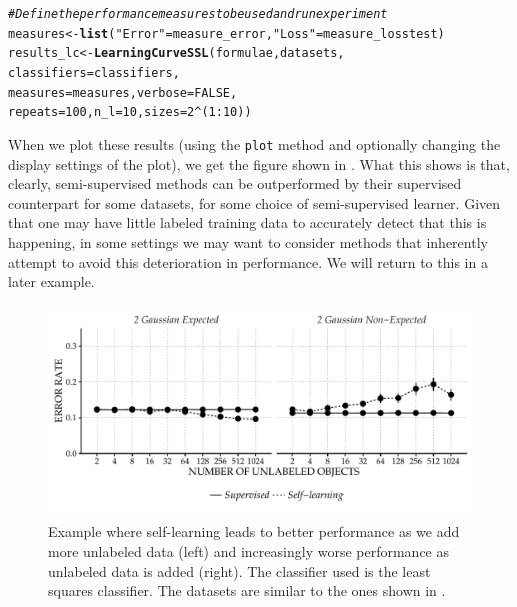 \documentclass[runningheads,a4paper]{llncs}\usepackage[]{graphicx}\usepackage[]{color}
\makeatletter
\def\maxwidth{ %
  \ifdim\Gin@nat@width>\linewidth
    \linewidth
  \else
    \Gin@nat@width
  \fi
}
\newcommand{\hlnum}[1]{\textcolor[rgb]{0.686,0.059,0.569}{#1}}%
\newcommand{\hlstr}[1]{\textcolor[rgb]{0.192,0.494,0.8}{#1}}%
\newcommand{\hlcom}[1]{\textcolor[rgb]{0.678,0.584,0.686}{\textit{#1}}}%
\newcommand{\hlopt}[1]{\textcolor[rgb]{0,0,0}{#1}}%
\newcommand{\hlstd}[1]{\textcolor[rgb]{0.345,0.345,0.345}{#1}}%
\newcommand{\hlkwb}[1]{\textcolor[rgb]{0.69,0.353,0.396}{#1}}%
\newcommand{\hlkwc}[1]{\textcolor[rgb]{0.333,0.667,0.333}{#1}}%
\newcommand{\hlkwd}[1]{\textcolor[rgb]{0.737,0.353,0.396}{\textbf{#1}}}%
\newenvironment{kframe}{%
 \def\at@end@of@kframe{}%
 \ifinner\ifhmode%
  \def\at@end@of@kframe{\end{minipage}}%
  \begin{minipage}{\columnwidth}%
 \fi\fi%
 \def\FrameCommand##1{\hskip\@totalleftmargin \hskip-\fboxsep
 \colorbox{shadecolor}{##1}\hskip-\fboxsep
     \hskip-\linewidth \hskip-\@totalleftmargin \hskip\columnwidth}%
 \MakeFramed {\advance\hsize-\width
   \@totalleftmargin\z@ \linewidth\hsize
   \@setminipage}}%
 {\par\unskip\endMakeFramed%
 \at@end@of@kframe}
\newenvironment{knitrout}{}{} %
\makeatother
\begin{document}
\begin{knitrout}
\begin{kframe}
\begin{alltt}
\hlcom{# Define the performance measures to be used and run experiment}
\hlstd{measures} \hlkwb{<-} \hlkwd{list}\hlstd{(}\hlstr{"Error"} \hlstd{=  measure_error,} \hlstr{"Loss"} \hlstd{= measure_losstest)}
\hlstd{results_lc} \hlkwb{<-} \hlkwd{LearningCurveSSL}\hlstd{(formulae,datasets,}
                           \hlkwc{classifiers}\hlstd{=classifiers,}
                           \hlkwc{measures}\hlstd{=measures,}\hlkwc{verbose}\hlstd{=}\hlnum{FALSE}\hlstd{,}
                           \hlkwc{repeats}\hlstd{=}\hlnum{100}\hlstd{,}\hlkwc{n_l}\hlstd{=}\hlnum{10}\hlstd{,}\hlkwc{sizes} \hlstd{=} \hlnum{2}\hlopt{^}\hlstd{(}\hlnum{1}\hlopt{:}\hlnum{10}\hlstd{))}
\end{alltt}
\end{kframe}
\end{knitrout}
\noindent When we plot these results (using the \texttt{plot} method and optionally changing the display settings of the plot), we get the figure shown in . What this shows is that, clearly, semi-supervised methods can be outperformed by their supervised counterpart for some datasets, for some choice of semi-supervised learner. Given that one may have little labeled training data to accurately detect that this is happening, in some settings we may want to consider methods that inherently attempt to avoid this deterioration in performance. We will return to this in a later example.

\begin{knitrout}
\color{fgcolor}\begin{figure}
\includegraphics[width=\maxwidth]{figure/plot-lc-1} \caption{Example where self-learning leads to better performance as we add more unlabeled data (left) and increasingly worse performance as unlabeled data is added (right). The classifier used is the least squares classifier. The datasets are similar to the ones shown in .}\label{fig:plot-lc}
\end{figure}


\end{knitrout}
\end{document}
